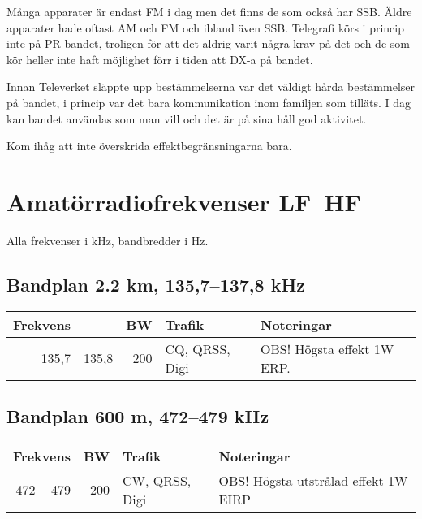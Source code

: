 {Många apparater är endast FM i dag men det finns de som också har SSB. Äldre
apparater hade oftast AM och FM och ibland även SSB. Telegrafi körs i princip
inte på PR-bandet, troligen för att det aldrig varit några krav på det och de
som kör heller inte haft möjlighet förr i tiden att DX-a på bandet.

Innan Televerket släppte upp bestämmelserna var det väldigt hårda bestämmelser
på bandet, i princip var det bara kommunikation inom familjen som tilläts. I dag
kan bandet användas som man vill och det är på sina håll god aktivitet.

Kom ihåg att inte överskrida effektbegränsningarna bara.

\section{Amatörradiofrekvenser LF--HF}

Alla frekvenser i kHz, bandbredder i Hz.

\subsection{Bandplan 2.2 km, 135,7--137,8 kHz}

\begin{tabular}{rrrll}
\textbf{Frekvens} &  & \textbf{BW} & \textbf{Trafik} & \textbf{Noteringar} \\ \hline
135,7 & 135,8 & 200 & CQ, QRSS, Digi & OBS! Högsta effekt 1W ERP. \\ \hline
\end{tabular}

\subsection{Bandplan 600 m, 472--479 kHz}
\begin{tabular}{rrrll}
\multicolumn{2}{c}{\textbf{Frekvens}} & \textbf{BW} & \textbf{Trafik} & \textbf{Noteringar} \\ \hline
472 & 479 & 200 & CW, QRSS, Digi & OBS! Högsta utstrålad effekt 1W EIRP \\ \hline
\end{tabular}

}
